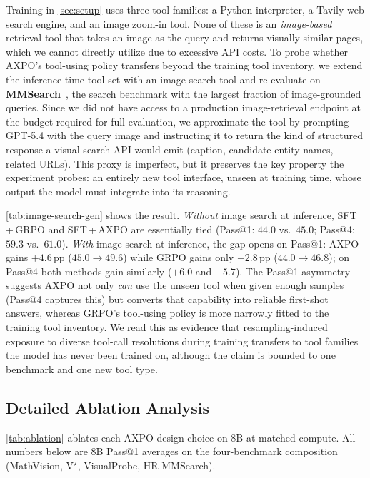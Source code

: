 \documentclass{llmxive}
\begin{document}
Training in \autoref{sec:setup} uses three tool families: a Python interpreter, a Tavily web search engine, and an image zoom-in tool. None of these is an \emph{image-based} retrieval tool that takes an image as the query and returns visually similar pages, which we cannot directly utilize due to excessive API costs.
To probe whether AXPO's tool-using policy transfers beyond the training tool inventory, we extend the inference-time tool set with an image-search tool and re-evaluate on \textbf{MMSearch}~\citep{mmsearch}, the search benchmark with the largest fraction of image-grounded queries. Since we did not have access to a production image-retrieval endpoint at the budget required for full evaluation, we approximate the tool by prompting GPT-5.4 with the query image and instructing it to return the kind of structured response a visual-search API would emit (caption, candidate entity names, related URLs). This proxy is imperfect, but it preserves the key property the experiment probes: an entirely new tool interface, unseen at training time, whose output the model must integrate into its reasoning.

\autoref{tab:image-search-gen} shows the result. \emph{Without} image search at inference, SFT\,+\,GRPO and SFT\,+\,AXPO are essentially tied (Pass@1: $44.0$ vs.\ $45.0$; Pass@4: $59.3$ vs.\ $61.0$). \emph{With} image search at inference, the gap opens on Pass@1: AXPO gains $+4.6$\,pp ($45.0 \to 49.6$) while GRPO gains only $+2.8$\,pp ($44.0 \to 46.8$); on Pass@4 both methods gain similarly ($+6.0$ and $+5.7$). The Pass@1 asymmetry suggests AXPO not only \emph{can} use the unseen tool when given enough samples (Pass@4 captures this) but converts that capability into reliable first-shot answers, whereas GRPO's tool-using policy is more narrowly fitted to the training tool inventory. We read this as evidence that resampling-induced exposure to diverse tool-call resolutions during training transfers to tool families the model has never been trained on, although the claim is bounded to one benchmark and one new tool type.

\subsection{Detailed Ablation Analysis}
\label{app:ablation-details}

\autoref{tab:ablation} ablates each AXPO design choice on 8B at matched compute. All numbers below are 8B Pass@1 averages on the four-benchmark composition (MathVision, V$^{\star}$, VisualProbe, HR-MMSearch).
\end{document}
